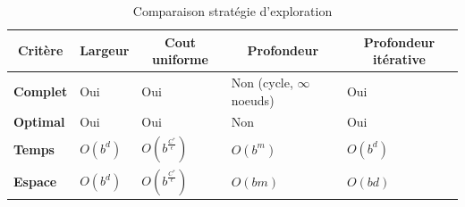 \begin{table}[H]
    \caption{Comparaison stratégie d'exploration}\label{tab:searchcomp}
    \begin{center}
        \begin{tabular}[c]{|l||l|l|l|l|}
            \hline
            \multicolumn{1}{|c|}{\textbf{Critère}} & 
            \multicolumn{1}{|c|}{\textbf{Largeur}} &
            \multicolumn{1}{c|}{\textbf{Cout uniforme}} &
            \multicolumn{1}{c|}{\textbf{Profondeur}} &
            \multicolumn{1}{c|}{\textbf{Profondeur itérative}} \\

            \hline
            \textbf{Complet}& Oui & Oui & Non (cycle, $\infty$ noeuds) & Oui \\ 
            \hline
            \textbf{Optimal}& Oui & Oui & Non & Oui\\ 
            \hline
            \textbf{Temps}& $O(b^d)$ & $O(b^{\frac{C^*}{\epsilon}})$ & $O(b^m)$ & $O(b^d)$\\ 
            \hline
            \textbf{Espace}& $O(b^d)$ & $O(b^{\frac{C^*}{\epsilon}})$ & $O(bm)$ & $O(bd)$\\

            \hline
        \end{tabular}
    \end{center}
\end{table}
